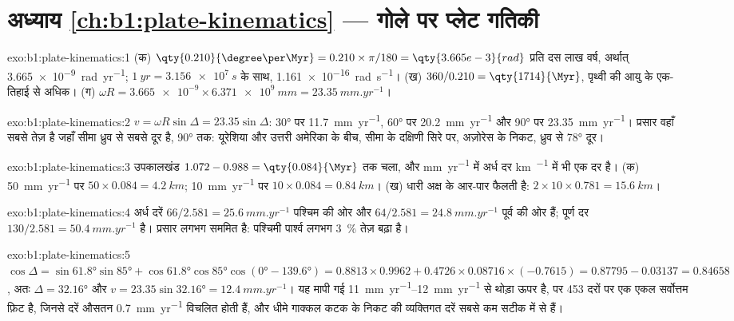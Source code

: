 \section*{अध्याय \ref{ch:b1:plate-kinematics} --- गोले पर प्लेट गतिकी}

\begin{solution}{exo:b1:plate-kinematics:1}
(क) $\qty{0.210}{\degree\per\Myr} = 0.210\times\pi/180 = \qty{3.665e-3}{rad}$
प्रति दस लाख वर्ष, अर्थात् \qty{3.665e-9}{rad.yr^{-1}}; $\qty{1}{yr} = \qty{3.156e7}{s}$ के साथ, \qty{1.161e-16}{rad.s^{-1}}। (ख) $360/0.210 =
\qty{1714}{\Myr}$, पृथ्वी की आयु के एक-तिहाई से अधिक। (ग) $\omega R =
\num{3.665e-9}\times\qty{6.371e9}{mm} = \qty{23.35}{mm.yr^{-1}}$।
\end{solution}

\begin{solution}{exo:b1:plate-kinematics:2}
$v = \omega R\sin\Delta = 23.35\sin\Delta$: \ang{30} पर \qty{11.7}{mm.yr^{-1}},
\ang{60} पर \qty{20.2}{mm.yr^{-1}} और \ang{90} पर \qty{23.35}{mm.yr^{-1}}। प्रसार वहाँ सबसे तेज़ है जहाँ सीमा ध्रुव से सबसे दूर है, \ang{90} तक: यूरेशिया और उत्तरी अमेरिका के बीच, सीमा के दक्षिणी सिरे पर, अज़ोरेस के निकट, ध्रुव से \ang{78} दूर।
\end{solution}

\begin{solution}{exo:b1:plate-kinematics:3}
उपकालखंड $1.072 - 0.988 = \qty{0.084}{\Myr}$ तक चला, और \unit{mm.yr^{-1}} में अर्ध दर \unit{km\per\Myr} में भी एक दर है। (क) \qty{50}{mm.yr^{-1}} पर $50\times0.084 =
\qty{4.2}{km}$; \qty{10}{mm.yr^{-1}} पर $10\times0.084 = \qty{0.84}{km}$। (ख) धारी अक्ष के आर-पार फैलती है:
$2\times10\times0.781 = \qty{15.6}{km}$।
\end{solution}

\begin{solution}{exo:b1:plate-kinematics:4}
अर्ध दरें $66/2.581 = \qty{25.6}{mm.yr^{-1}}$ पश्चिम की ओर और
$64/2.581 = \qty{24.8}{mm.yr^{-1}}$ पूर्व की ओर हैं; पूर्ण दर
$130/2.581 = \qty{50.4}{mm.yr^{-1}}$ है। प्रसार लगभग सममित है: पश्चिमी पार्श्व लगभग \qty{3}{\percent} तेज़ बढ़ा है।
\end{solution}

\begin{solution}{exo:b1:plate-kinematics:5}
$\cos\Delta = \sin\ang{61.8}\sin\ang{85} + \cos\ang{61.8}\cos\ang{85}
\cos(\ang{0} - \ang{139.6}) = 0.8813\times0.9962 + 0.4726\times0.08716\times
(-0.7615) = 0.87795 - 0.03137 = 0.84658$, अतः $\Delta = \ang{32.16}$ और
$v = 23.35\sin\ang{32.16} = \qty{12.4}{mm.yr^{-1}}$। यह मापी गई \qtyrange{11}{12}{mm.yr^{-1}} से थोड़ा ऊपर है, पर  453 दरों पर एक एकल सर्वोत्तम फ़िट है, जिनसे दरें औसतन \qty{0.7}{mm.yr^{-1}} विचलित होती हैं, और धीमे गाक्कल कटक के निकट की व्यक्तिगत दरें सबसे कम सटीक में से हैं।
\end{solution}

